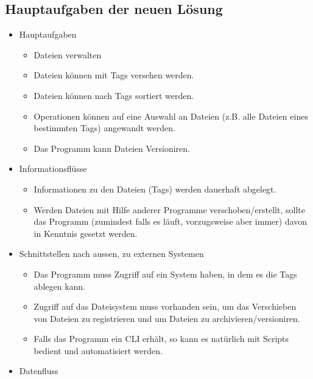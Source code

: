 \documentclass[10pt,paper=a4,final]{scrartcl}
\begin{document}
\subsection{Hauptaufgaben der neuen L\"osung}
\begin{itemize}
  \item Hauptaufgaben
    \begin{itemize}
      \item Dateien verwalten
      \item Dateien können mit Tags versehen werden.
      \item Dateien können nach Tags sortiert werden.
      \item Operationen können auf eine Auswahl an Dateien (z.B. alle Dateien eines bestimmten Tags) angewandt werden.
      \item Das Programm kann Dateien Versioniren.
    \end{itemize}
  \item Informationsflüsse
    \begin{itemize}
      \item Informationen zu den Dateien (Tags) werden dauerhaft abgelegt.
      \item Werden Dateien mit Hilfe anderer Programme verschoben/erstellt, sollte das Programm (zumindest falls es läuft, vorzugsweise aber immer) davon in Kenntnis gesetzt werden.
    \end{itemize}
  \item Schnittstellen nach aussen, zu externen Systemen
    \begin{itemize}
      \item Das Programm muss Zugriff auf ein System haben, in dem es die Tags ablegen kann.
      \item Zugriff auf das Dateisystem muss vorhanden sein, um das Verschieben von Dateien zu registrieren und um Dateien zu archivieren/versioniren.
      \item Falls das Programm ein CLI erhält, so kann es natürlich mit Scripts bedient und automatisiert werden.
    \end{itemize}
  \item Datenfluss
\end{itemize}
\end{document}

